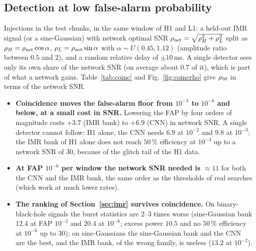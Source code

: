 \subsection{Detection at low false-alarm probability}
Injections in the test chunks, in the same window of H1 and L1: a held-out IMR signal (or a sine-Gaussian) with network optimal SNR $\rho_{\rm net}=\sqrt{\rho_H^2+\rho_L^2}$ split as $\rho_H=\rho_{\rm net}\cos\alpha$, $\rho_L=\rho_{\rm net}\sin\alpha$ with $\alpha\sim U(0.45,1.12)$ (amplitude ratio between $0.5$ and $2$), and a random relative delay of $\pm10$\,ms. A single detector sees only its own share of the network SNR (on average about $0.7$ of it), which is part of what a network gains. Table~\ref{tab:coinc} and Fig.~\ref{fig:coincrho} give $\rho_{50}$ in terms of the network SNR.
\begin{itemize}[nosep]
\item \textbf{Coincidence moves the false-alarm floor from $10^{-3}$ to $10^{-6}$ and below, at a small cost in SNR.} Lowering the FAP by four orders of magnitude costs $+3.7$ (IMR bank) to $+6.9$ (CNN) in network SNR. A single detector cannot follow: H1 alone, the CNN needs $6.9$ at $10^{-2}$ and $9.8$ at $10^{-3}$; the IMR bank of H1 alone does not reach $50\,\%$ efficiency at $10^{-3}$ up to a network SNR of 30, because of the glitch tail of the H1 data.
\item \textbf{At FAP $10^{-6}$ per window the network SNR needed is $\approx11$} for both the CNN and the IMR bank, the same order as the thresholds of real searches (which work at much lower rates).
\item \textbf{The ranking of Section~\ref{sec:imr} survives coincidence.} On binary-black-hole signals the burst statistics are $2$--$3$ times worse (sine-Gaussian bank $12.4$ at FAP $10^{-2}$ and $20.4$ at $10^{-6}$; excess power $10.5$ and no $50\,\%$ efficiency at $10^{-6}$ up to 30); on sine-Gaussians the sine-Gaussian bank and the CNN are the best, and the IMR bank, of the wrong family, is useless ($13.2$ at $10^{-2}$).
\end{itemize}

